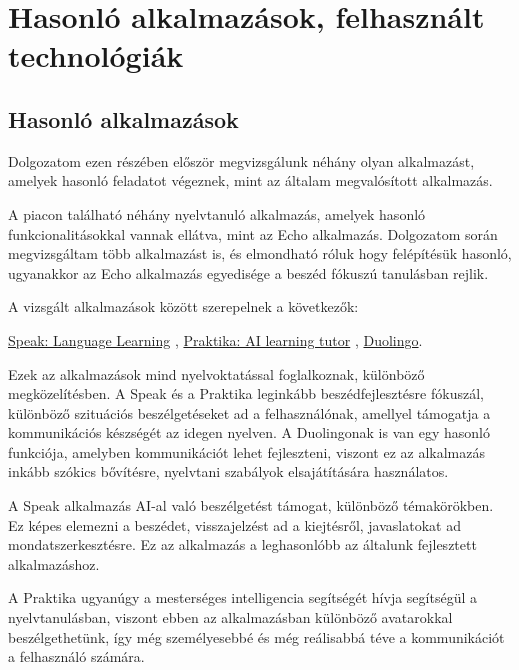 \chapter{Hasonló alkalmazások, felhasznált technológiák} \label{fejezet3}

\section {Hasonló alkalmazások}

Dolgozatom ezen részében először megvizsgálunk néhány olyan alkalmazást, amelyek hasonló feladatot végeznek, mint az általam megvalósított alkalmazás.

A piacon található néhány nyelvtanuló alkalmazás, amelyek hasonló funkcionalitásokkal vannak ellátva, mint az Echo alkalmazás. Dolgozatom során megvizsgáltam több alkalmazást is, és elmondható róluk hogy felépítésük hasonló, ugyanakkor az Echo alkalmazás egyedisége a beszéd fókuszú tanulásban rejlik.

A vizsgált alkalmazások között szerepelnek a következők: 

\href{https://play.google.com/store/apps/details?id=com.selabs.speak}{Speak: Language Learning} \cite{speak}, \href{https://play.google.com/store/apps/details?id=ai.praktika.android&hl=en}{Praktika: AI learning tutor} \cite{praktika}, \href{https://play.google.com/store/apps/details?id=com.duolingo&hl=en}{Duolingo}\cite{duolingoMax}.

Ezek az alkalmazások mind nyelvoktatással foglalkoznak, különböző megközelítésben. A Speak és a Praktika leginkább beszédfejlesztésre fókuszál, különböző szituációs beszélgetéseket ad a felhasználónak, amellyel támogatja a kommunikációs készségét az idegen nyelven. A Duolingonak is van egy hasonló funkciója, amelyben kommunikációt lehet fejleszteni, viszont ez az alkalmazás inkább szókics bővítésre, nyelvtani szabályok elsajátítására használatos.

A Speak alkalmazás AI-al való beszélgetést támogat, különböző témakörökben. Ez képes elemezni a beszédet, visszajelzést ad a kiejtésről, javaslatokat ad mondatszerkesztésre. \cite{speakAppStore} Ez az alkalmazás a leghasonlóbb az általunk fejlesztett alkalmazáshoz.

A Praktika ugyanúgy a mesterséges intelligencia segítségét hívja segítségül a nyelvtanulásban, viszont ebben az alkalmazásban különböző avatarokkal beszélgethetünk, így még személyesebbé és még reálisabbá téve a kommunikációt a felhasználó számára.\cite{praktikaGooglePlay}

